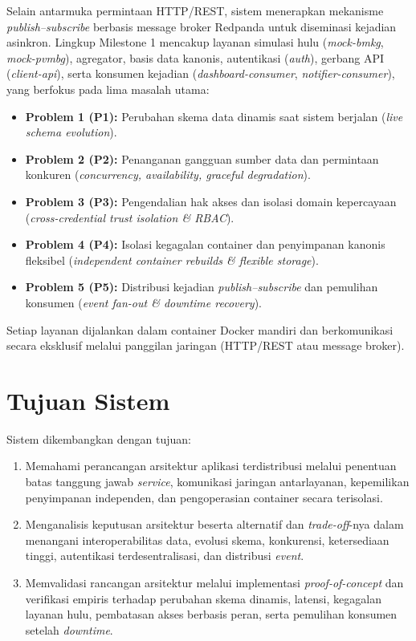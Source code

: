 Selain antarmuka permintaan HTTP/REST, sistem menerapkan mekanisme \textit{publish--subscribe} berbasis message broker Redpanda untuk diseminasi kejadian asinkron. Lingkup Milestone 1 mencakup layanan simulasi hulu (\textit{mock-bmkg}, \textit{mock-pvmbg}), agregator, basis data kanonis, autentikasi (\textit{auth}), gerbang API (\textit{client-api}), serta konsumen kejadian (\textit{dashboard-consumer}, \textit{notifier-consumer}), yang berfokus pada lima masalah utama:
\begin{itemize}
    \item \textbf{Problem 1 (P1):} Perubahan skema data dinamis saat sistem berjalan (\textit{live schema evolution}).
    \item \textbf{Problem 2 (P2):} Penanganan gangguan sumber data dan permintaan konkuren (\textit{concurrency, availability, graceful degradation}).
    \item \textbf{Problem 3 (P3):} Pengendalian hak akses dan isolasi domain kepercayaan (\textit{cross-credential trust isolation \& RBAC}).
    \item \textbf{Problem 4 (P4):} Isolasi kegagalan container dan penyimpanan kanonis fleksibel (\textit{independent container rebuilds \& flexible storage}).
    \item \textbf{Problem 5 (P5):} Distribusi kejadian \textit{publish--subscribe} dan pemulihan konsumen (\textit{event fan-out \& downtime recovery}).
\end{itemize}

Setiap layanan dijalankan dalam container Docker mandiri dan berkomunikasi secara eksklusif melalui panggilan jaringan (HTTP/REST atau message broker).

\section{Tujuan Sistem}
Sistem dikembangkan dengan tujuan:
\begin{enumerate}
    \item Memahami perancangan arsitektur aplikasi terdistribusi melalui penentuan batas tanggung jawab \textit{service}, komunikasi jaringan antarlayanan, kepemilikan penyimpanan independen, dan pengoperasian container secara terisolasi.
    \item Menganalisis keputusan arsitektur beserta alternatif dan \textit{trade-off}-nya dalam menangani interoperabilitas data, evolusi skema, konkurensi, ketersediaan tinggi, autentikasi terdesentralisasi, dan distribusi \textit{event}.
    \item Memvalidasi rancangan arsitektur melalui implementasi \textit{proof-of-concept} dan verifikasi empiris terhadap perubahan skema dinamis, latensi, kegagalan layanan hulu, pembatasan akses berbasis peran, serta pemulihan konsumen setelah \textit{downtime}.
\end{enumerate}

